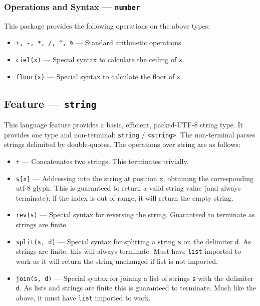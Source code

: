\subsubsection{Operations and Syntax --- \texttt{number}} %
\label{ssub:operations_and_syntax_number}
This package provides the following operations on the above types:
\begin{itemize}
    \item \texttt{+, -, *, /, ^, \%} --- Standard arithmetic operations.
    \item \texttt{ciel(x)} --- Special syntax to calculate the ceiling of \texttt{x}.
    \item \texttt{floor(x)} --- Special syntax to calculate the floor of \texttt{x}.
\end{itemize}



\subsection{Feature --- \texttt{string}} %
\label{sub:feature_string}
This language feature provides a basic, efficient, packed-UTF-8 string type. 
It provides one type and non-terminal: \texttt{string} / \texttt{<string>}.
The non-terminal parses strings delimited by double-quotes. 
The operations over string are as follows:
\begin{itemize}
    \item \texttt{+} --- Concatenates two strings. 
    This terminates trivially.
    \item \texttt{s[x]} --- Addressing into the string at position x, obtaining the corresponding utf-8 glyph.
    This is guaranteed to return a valid string value (and always terminate): if the index is out of range, it will return the empty string.
    \item \texttt{rev(s)} --- Special syntax for reversing the string.
    Guaranteed to terminate as strings are finite.
    \item \texttt{split(s, d)} --- Special syntax for splitting a string \texttt{s} on the delimiter \texttt{d}. 
    As strings are finite, this will always terminate.
    Must have \texttt{list} imported to work as it will return the string unchanged if list is not imported. 
    \item \texttt{join(s, d)} --- Special syntax for joining a list of strings \texttt{s} with the delimiter \texttt{d}.
    As lists and strings are finite this is guaranteed to terminate.
    Much like the above, it must have \texttt{list} imported to work. 
\end{itemize}

